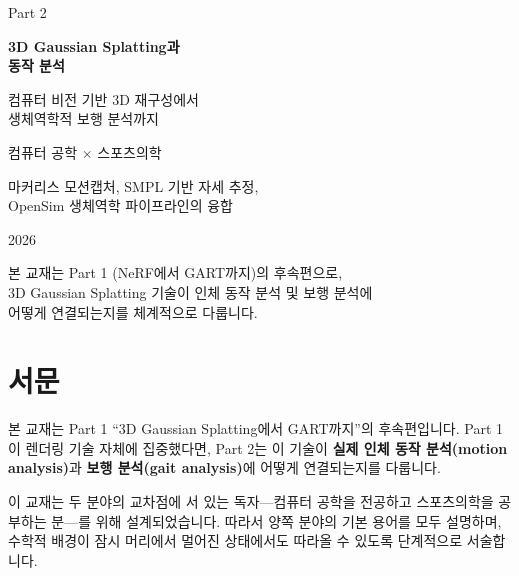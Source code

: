 \documentclass[11pt, a4paper]{report}
\begin{document}
\begin{titlepage}
\centering
\vspace*{1.5cm}

{\Large\color{gray} Part 2}

\vspace{0.5cm}

{\Huge\bfseries\color{defblue} 3D Gaussian Splatting과\\[0.3cm] 동작 분석}

\vspace{1cm}

{\LARGE\color{defblue!70!black} 컴퓨터 비전 기반 3D 재구성에서\\생체역학적 보행 분석까지}

\vspace{2cm}

{\large 컴퓨터 공학 $\times$ 스포츠의학}

\vspace{0.5cm}

{\large 마커리스 모션캡처, SMPL 기반 자세 추정,\\OpenSim 생체역학 파이프라인의 융합}

\vspace{3cm}

{\large 2026}

\vspace{\fill}

{\small\color{gray} 본 교재는 Part 1 (NeRF에서 GART까지)의 후속편으로,\\
3D Gaussian Splatting 기술이 인체 동작 분석 및 보행 분석에\\
어떻게 연결되는지를 체계적으로 다룹니다.}
\end{titlepage}

\tableofcontents
\newpage

\chapter*{서문}

본 교재는 Part 1 ``3D Gaussian Splatting에서 GART까지''의 후속편입니다. Part 1이 렌더링 기술 자체에 집중했다면, Part 2는 이 기술이 \textbf{실제 인체 동작 분석(motion analysis)}과 \textbf{보행 분석(gait analysis)}에 어떻게 연결되는지를 다룹니다.

이 교재는 두 분야의 교차점에 서 있는 독자---컴퓨터 공학을 전공하고 스포츠의학을 공부하는 분---를 위해 설계되었습니다. 따라서 양쪽 분야의 기본 용어를 모두 설명하며, 수학적 배경이 잠시 머리에서 멀어진 상태에서도 따라올 수 있도록 단계적으로 서술합니다.
\end{document}
